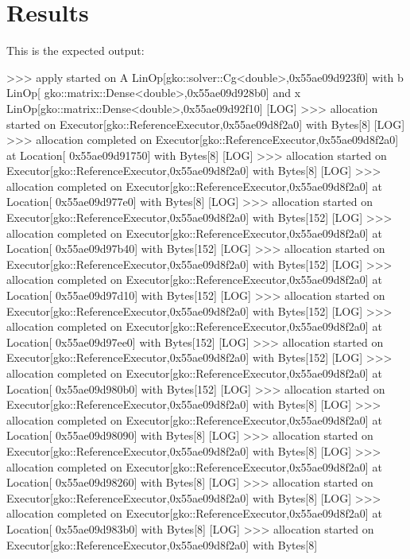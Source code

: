 \section*{Results}

This is the expected output\+:


\begin{DoxyCode}
[LOG] >>> apply started on A LinOp[gko::solver::Cg<double>,0x55ae09d923f0] with b LinOp[
      gko::matrix::Dense<double>,0x55ae09d928b0] and x LinOp[gko::matrix::Dense<double>,0x55ae09d92f10]
[LOG] >>> allocation started on Executor[gko::ReferenceExecutor,0x55ae09d8f2a0] with Bytes[8]
[LOG] >>> allocation completed on Executor[gko::ReferenceExecutor,0x55ae09d8f2a0] at Location[
      0x55ae09d91750] with Bytes[8]
[LOG] >>> allocation started on Executor[gko::ReferenceExecutor,0x55ae09d8f2a0] with Bytes[8]
[LOG] >>> allocation completed on Executor[gko::ReferenceExecutor,0x55ae09d8f2a0] at Location[
      0x55ae09d977e0] with Bytes[8]
[LOG] >>> allocation started on Executor[gko::ReferenceExecutor,0x55ae09d8f2a0] with Bytes[152]
[LOG] >>> allocation completed on Executor[gko::ReferenceExecutor,0x55ae09d8f2a0] at Location[
      0x55ae09d97b40] with Bytes[152]
[LOG] >>> allocation started on Executor[gko::ReferenceExecutor,0x55ae09d8f2a0] with Bytes[152]
[LOG] >>> allocation completed on Executor[gko::ReferenceExecutor,0x55ae09d8f2a0] at Location[
      0x55ae09d97d10] with Bytes[152]
[LOG] >>> allocation started on Executor[gko::ReferenceExecutor,0x55ae09d8f2a0] with Bytes[152]
[LOG] >>> allocation completed on Executor[gko::ReferenceExecutor,0x55ae09d8f2a0] at Location[
      0x55ae09d97ee0] with Bytes[152]
[LOG] >>> allocation started on Executor[gko::ReferenceExecutor,0x55ae09d8f2a0] with Bytes[152]
[LOG] >>> allocation completed on Executor[gko::ReferenceExecutor,0x55ae09d8f2a0] at Location[
      0x55ae09d980b0] with Bytes[152]
[LOG] >>> allocation started on Executor[gko::ReferenceExecutor,0x55ae09d8f2a0] with Bytes[8]
[LOG] >>> allocation completed on Executor[gko::ReferenceExecutor,0x55ae09d8f2a0] at Location[
      0x55ae09d98090] with Bytes[8]
[LOG] >>> allocation started on Executor[gko::ReferenceExecutor,0x55ae09d8f2a0] with Bytes[8]
[LOG] >>> allocation completed on Executor[gko::ReferenceExecutor,0x55ae09d8f2a0] at Location[
      0x55ae09d98260] with Bytes[8]
[LOG] >>> allocation started on Executor[gko::ReferenceExecutor,0x55ae09d8f2a0] with Bytes[8]
[LOG] >>> allocation completed on Executor[gko::ReferenceExecutor,0x55ae09d8f2a0] at Location[
      0x55ae09d983b0] with Bytes[8]
[LOG] >>> allocation started on Executor[gko::ReferenceExecutor,0x55ae09d8f2a0] with Bytes[8]

\end{DoxyCode}
